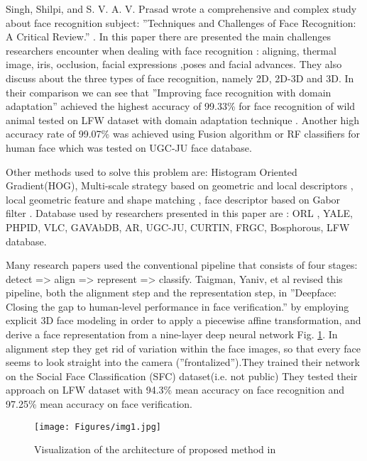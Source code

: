 \documentclass[runningheads,a4paper,11pt]{report}
\begin{document}
Singh, Shilpi, and S. V. A. V. Prasad wrote a comprehensive and complex study about face recognition subject:  ''Techniques and Challenges of Face Recognition: A Critical Review.''\cite{singh2018techniques} . In this paper there are presented the main challenges researchers encounter when dealing with face recognition : aligning, thermal image, iris, occlusion, facial expressions ,poses and facial advances. They also discuss about the three types of face recognition, namely 2D, 2D-3D and 3D. In their comparison we can see that  ''Improving face recognition with domain adaptation'' \cite{wen2018improving} achieved the highest accuracy of 99.33\% for face recognition of wild animal tested on LFW dataset with domain adaptation technique . Another high accuracy rate of 99.07\%  was achieved using Fusion algorithm \cite{seal2016human} or RF classifiers for human face which was tested on UGC-JU face database.

Other methods used to solve this problem are:  Histogram Oriented Gradient(HOG)\cite{fathi2016new}, Multi-scale strategy based on geometric and local descriptors \cite{zhou2018pose}, local geometric feature and shape matching \cite{guo2016ei3d},  face descriptor based on Gabor filter \cite{aksasse2017novel}. Database used by researchers presented in this paper are : ORL , YALE, PHPID, VLC, GAVAbDB, AR, UGC-JU, CURTIN, FRGC, Bosphorous, LFW database.

Many research papers used the conventional pipeline that consists of four stages: detect => align => represent => classify. Taigman, Yaniv, et al revised this pipeline, both the alignment step and the representation step,  in ''Deepface: Closing the gap to human-level performance in face verification.'' \cite{taigman2014deepface}  by employing explicit 3D face modeling in order to apply a piecewise affine transformation, and derive a face representation from a nine-layer deep neural network Fig. \ref{img1}. In alignment step they get rid of variation within the face images, so that every face seems to look straight into the camera (''frontalized'').They trained their network on the Social Face Classification (SFC) dataset(i.e. not public) They tested their approach on  LFW dataset with  94.3\% mean accuracy on face recognition and  97.25\% mean accuracy on face verification.

\begin{figure}[!htb]
    \centering
    \texttt{[image: Figures/img1.jpg]}
    \caption{Visualization of the architecture of proposed method in \cite{taigman2014deepface}}
    \label{img1}
\end{figure}
\end{document}
